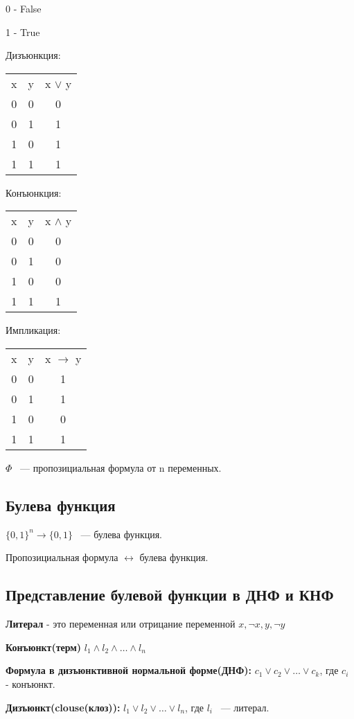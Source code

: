 \documentclass[12pt]{article}
\begin{document}
0 - False

1 - True

Дизъюнкция:
\begin{tabular}{c c|c}
x & y & x $\vee$ y \\
0 & 0 & 0\\
0 & 1 & 1\\
1 & 0 & 1\\
1 & 1 & 1\\
\end{tabular}

Конъюнкция:
\begin{tabular}{c c|c}
x & y & x $\wedge$ y \\
0 & 0 & 0\\
0 & 1 & 0\\
1 & 0 & 0\\
1 & 1 & 1\\
\end{tabular}

Импликация:
\begin{tabular}{c c|c}
x & y & x $\to$ y \\
0 & 0 & 1\\
0 & 1 & 1\\
1 & 0 & 0\\
1 & 1 & 1\\
\end{tabular}

$\Phi$ ~--- пропозициальная формула от n переменных. 

\subsection{Булева функция}

$\{0, 1\}^n \to \{0, 1\}$ ~---  булева функция.

Пропозициальная формула  $\leftrightarrow$ булева функция.

\subsection{Представление булевой функции в ДНФ и КНФ}

{\bf Литерал} - это переменная или отрицание переменной $x, \neg x, y, \neg y$

{\bf Конъюнкт(терм)}  $l_1 \wedge l_2 \wedge \ldots \wedge l_n$

{\bf Формула в дизъюнктивной нормальной форме(ДНФ):} $c_1\vee c_2 \vee \ldots \vee c_k$, где $c_i$ - конъюнкт.

{\bf Дизъюнкт(clouse(клоз)):} $l_1 \vee l_2 \vee \ldots \vee l_n$, где $l_i$ ~--- литерал.
\end{document}
